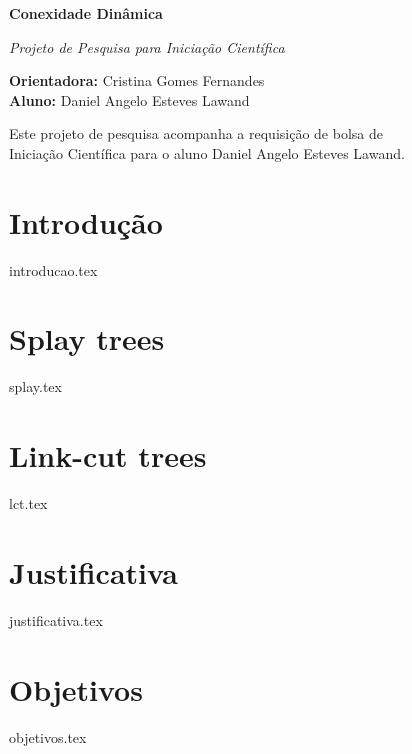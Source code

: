 \documentclass[12pt]{article}
\begin{document}
\begin{center}

{\Large {\bf Conexidade Dinâmica}} 

\vspace{0.2cm}
{\large {\em Projeto de Pesquisa para Iniciação Científica}

}

\vspace{0.2cm}
{\small 
{\bf Orientadora:} Cristina Gomes Fernandes \\
{\bf Aluno:} Daniel Angelo Esteves Lawand
}


\vspace*{\fill}
{\small Este projeto de pesquisa acompanha a requisição de bolsa de \\ 
Iniciação Científica para o aluno Daniel Angelo Esteves Lawand.}

\end{center}
\vspace*{\fill}

\newpage

\section{Introdução}  
{introducao.tex}

\section{Splay trees}  
{splay.tex}

\section{Link-cut trees}  
{lct.tex}

\section{Justificativa}  
{justificativa.tex}

\section{Objetivos}  
{objetivos.tex}
\end{document}
